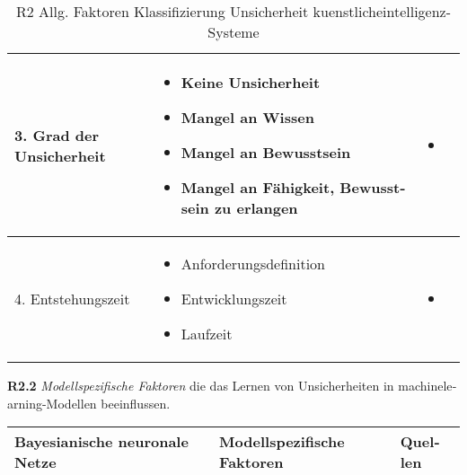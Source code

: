 \begin{otherlanguage}{ngerman}
\begin{table}[!htpb]
\begin{tabularx}{\textwidth}{|l|X|X|}
    \multirow{7}{*}{3. Grad der Unsicherheit} &
    \begin{itemize}[leftmargin=*, topsep=0em, itemsep=0em, label={}]
      \item Keine Unsicherheit
      \item Mangel an Wissen
      \item Mangel an Bewusstsein
      \item Mangel an Fähigkeit, Bewusstsein zu erlangen
    \end{itemize} &
    \begin{itemize}[leftmargin=*, topsep=0em, itemsep=0em, label={}]
      \item \parencite[S.~56–58]{AndreasKreutz2022}
    \end{itemize} \\ \hline

    \multirow{5}{*}{4. Entstehungszeit} &
    \begin{itemize}[leftmargin=*, topsep=0em, itemsep=0em, label={}]
      \item Anforderungsdefinition
      \item Entwicklungszeit
      \item Laufzeit
    \end{itemize} &
    \begin{itemize}[leftmargin=*, topsep=0em, itemsep=0em, label={}]
      \item \parencite[S.~60]{AndreasKreutz2022}
    \end{itemize} \\ \hline
  \end{tabularx}
  \caption{R2 Allg. Faktoren Klassifizierung Unsicherheit \gls{kuenstlicheintelligenz}-Systeme}
  \label{tab:chapter6r21}
\end{table}

\newpage

\textbf{R2.2} \textit{Modellspezifische Faktoren} die das Lernen von Unsicherheiten in \gls{machinelearning}-Modellen beeinflussen.

\begin{table}[!htpb]
  \centering
  \footnotesize
  \begin{tabularx}{\textwidth}{|l|X|X|}
    \hline
    \textbf{\gls{Bayesianische neuronale Netze}} & \hspace{0.6em}\textbf{Modellspezifische Faktoren} & \hspace{0.6em}\textbf{Quellen} \\ \hline


\end{tabularx}
\end{table}
\end{otherlanguage}
